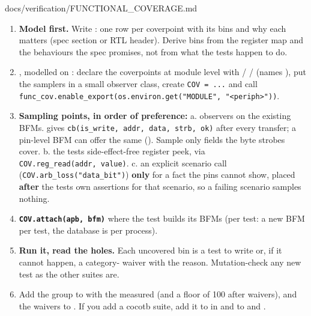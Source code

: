 \begin{relocated}{docs/verification/FUNCTIONAL_COVERAGE.md}
\begin{enumerate}
\def\labelenumi{\arabic{enumi}.}
\tightlist
\item
  \textbf{Model first.} Write
  : one
  row per coverpoint with its bins and why each matters (spec section or
  RTL header). Derive bins from the register map and the behaviours the
  spec promises, not from what the tests happen to do.
\item
  \textbf{}, modelled on
  : declare the coverpoints at module level with
   /  /  (names
  ), put the samplers in a small
  observer class, create
  \texttt{COV\ =\allowbreak{}\ .\allowbreak{}.\allowbreak{}.\allowbreak{}}
  and call
  \texttt{func\_\allowbreak{}cov.\allowbreak{}enable\_\allowbreak{}export(os.\allowbreak{}environ.\allowbreak{}get("MODULE",\allowbreak{}\ "<periph>"))}.
\item
  \textbf{Sampling points, in order of preference:} a. observers on the
  existing BFMs.  gives
  \texttt{cb(is\_\allowbreak{}write,\allowbreak{}\ addr,\allowbreak{}\ data,\allowbreak{}\ strb,\allowbreak{}\ ok)}
  after every transfer; a pin-level BFM can offer the same
  (). Sample only fields the byte strobes
  cover. b. the tests\textquotesingle{} side-effect-free register peek,
  via
  \texttt{COV.\allowbreak{}reg\_\allowbreak{}read(addr,\allowbreak{}\ value)}.
  c. an explicit scenario call
  (\texttt{COV.\allowbreak{}arb\_\allowbreak{}loss("data\_\allowbreak{}bit")})
  \textbf{only} for a fact the pins cannot show, placed \textbf{after}
  the test\textquotesingle s own assertions for that scenario, so a
  failing scenario samples nothing.
\item
  \textbf{\texttt{COV.\allowbreak{}attach(apb,\allowbreak{}\ bfm)}}
  where the test builds its BFMs (per test: a new BFM per test, the
  database is per process).
\item
  \textbf{Run it, read the holes.} Each uncovered bin is a test to write
  or, if it cannot happen, a category- waiver with the reason.
  Mutation-check any new test as the other suites are.
\item
  Add the group to  with the
  measured  (and a floor of 100 after waivers), and the
  waivers to . If you add a cocotb
  suite, add it to  in 
  and to  and
  .
\end{enumerate}


\end{relocated}
